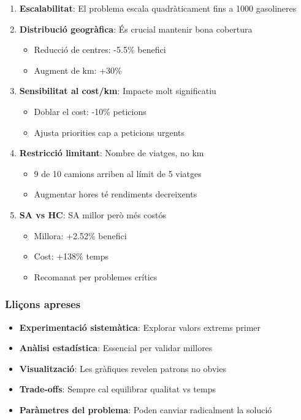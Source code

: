 \begin{enumerate}
    \item \textbf{Escalabilitat}: El problema escala quadràticament fins a 1000 gasolineres
    
    \item \textbf{Distribució geogràfica}: És crucial mantenir bona cobertura
    \begin{itemize}
        \item Reducció de centres: -5.5\% benefici
        \item Augment de km: +30\%
    \end{itemize}
    
    \item \textbf{Sensibilitat al cost/km}: Impacte molt significatiu
    \begin{itemize}
        \item Doblar el cost: -10\% peticions
        \item Ajusta priorities cap a peticions urgents
    \end{itemize}
    
    \item \textbf{Restricció limitant}: Nombre de viatges, no km
    \begin{itemize}
        \item 9 de 10 camions arriben al límit de 5 viatges
        \item Augmentar hores té rendiments decreixents
    \end{itemize}
    
    \item \textbf{SA vs HC}: SA millor però més costós
    \begin{itemize}
        \item Millora: +2.52\% benefici
        \item Cost: +138\% temps
        \item Recomanat per problemes crítics
    \end{itemize}
\end{enumerate}

\subsubsection{Lliçons apreses}

\begin{itemize}
    \item \textbf{Experimentació sistemàtica}: Explorar valors extrems primer
    \item \textbf{Anàlisi estadística}: Essencial per validar millores
    \item \textbf{Visualització}: Les gràfiques revelen patrons no obvies
    \item \textbf{Trade-offs}: Sempre cal equilibrar qualitat vs temps
    \item \textbf{Paràmetres del problema}: Poden canviar radicalment la solució
\end{itemize}

